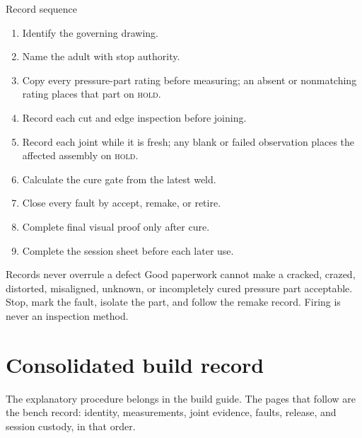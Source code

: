\begin{telospanel}{Record sequence}
\begin{enumerate}[leftmargin=1.6em,itemsep=0.25em]
\item Identify the governing drawing.
\item Name the adult with stop authority.
\item Copy every pressure-part rating before measuring; an absent or
nonmatching rating places that part on \textsc{hold}.
\item Record each cut and edge inspection before joining.
\item Record each joint while it is fresh; any blank or failed observation
places the affected assembly on \textsc{hold}.
\item Calculate the cure gate from the latest weld.
\item Close every fault by accept, remake, or retire.
\item Complete final visual proof only after cure.
\item Complete the session sheet before each later use.
\end{enumerate}
\end{telospanel}

\begin{teloshazard}{Records never overrule a defect}
Good paperwork cannot make a cracked, crazed, distorted, misaligned, unknown,
or incompletely cured pressure part acceptable. Stop, mark the fault, isolate
the part, and follow the remake record. Firing is never an inspection method.
\end{teloshazard}

\clearpage
\section{Consolidated build record}
The explanatory procedure belongs in the build guide. The pages that follow
are the bench record: identity, measurements, joint evidence, faults, release,
and session custody, in that order.

\begin{telosfacts}[0.22]
\end{telosfacts}

